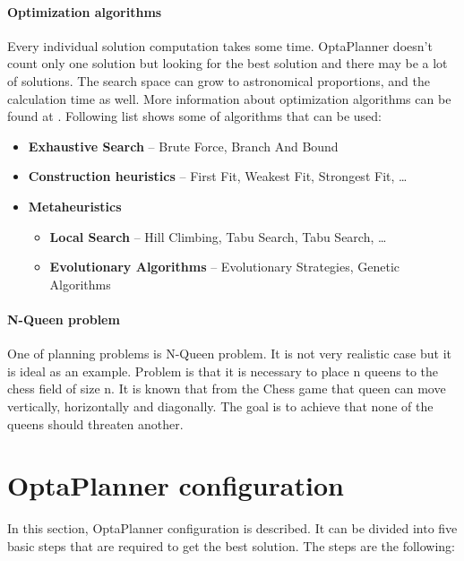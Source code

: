 \paragraph{Optimization algorithms}\label{optimalAlg}
Every individual solution computation takes some time. OptaPlanner doesn't count only one solution but looking for the best solution and there may be a lot of solutions. The search space can grow to astronomical proportions, and the calculation time as well. More information about optimization algorithms can be found at \cite{OptaPlannerDoc}. Following list shows some of algorithms that can be used:
\begin{itemize}
\item \textbf{Exhaustive Search} -- Brute Force,  Branch And Bound
\item \textbf{Construction heuristics} --  First Fit, Weakest Fit,  Strongest Fit, \dots
\item \textbf{Metaheuristics}
\begin{itemize}
\item \textbf{Local Search} --  Hill Climbing, Tabu Search, Tabu Search, \dots
\item \textbf{Evolutionary Algorithms} -- Evolutionary Strategies, Genetic Algorithms
\end{itemize}
\end{itemize}

\paragraph{N-Queen problem}
One of planning problems is N-Queen problem. It is not very realistic case but it is ideal as an example. Problem is that it is necessary to place n queens to the chess field of size n. It is known that from the Chess game that queen can move vertically, horizontally and diagonally. The goal is to achieve that none of the queens should threaten another.

\section{OptaPlanner configuration}\label{plannerConf}
In this section, OptaPlanner configuration is described. It can be divided into five basic steps that are required to get the best solution. The steps are the following:

